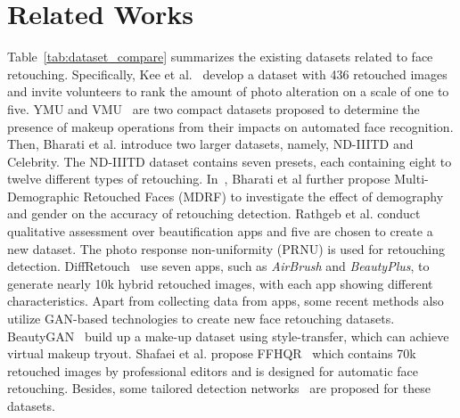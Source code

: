 \documentclass[sigconf]{acmart}
\begin{document}
\section{Related Works}
Table~\ref{tab:dataset_compare} summarizes the existing datasets related to face retouching.
Specifically, 
Kee et al.~\cite{kee2011perceptual} develop a dataset with 436 retouched images and invite volunteers to rank the amount of photo alteration on a scale of one to five.  
YMU and VMU~\cite{VMUYMU} are two compact datasets proposed to determine the presence of makeup operations from their impacts on automated face recognition.
Then, Bharati et al.\cite{bharati2016detecting} introduce two larger datasets, namely, ND-IIITD and Celebrity.
The ND-IIITD dataset contains seven presets, each containing eight to twelve different types of retouching. 
In~\cite{bharati2017demography}, Bharati et al further propose Multi-Demographic Retouched Faces (MDRF) to investigate the effect of demography and gender on the accuracy of retouching detection.
Rathgeb et al.\cite{rathgeb2020prnu} conduct qualitative assessment over beautification apps and five are chosen to create a new dataset. 
The photo response non-uniformity (PRNU) is used for retouching detection.
DiffRetouch~\cite{rathgeb2020differential} use seven apps, such as \textit{AirBrush} and \textit{BeautyPlus}, to generate nearly 10k hybrid retouched images, with each app showing different characteristics.
Apart from collecting data from apps, some recent methods also utilize GAN-based technologies to create new face retouching datasets.
BeautyGAN~\cite{li2018beautygan} build up a make-up dataset using style-transfer, which can achieve virtual makeup tryout.
Shafaei et al. propose FFHQR~\cite{shafaei2021autoretouch} which contains 70k retouched images by professional editors and is designed for automatic face retouching. 
Besides, some tailored detection networks~\cite{jain2018detecting,jain2020detecting,geng2020masked} are proposed for these datasets.
\end{document}
